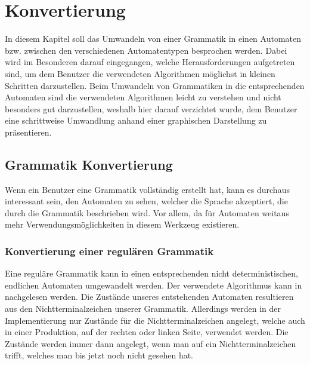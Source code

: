 



\chapter{Konvertierung}\label{ConverTo}

In diesem Kapitel soll das Umwandeln von einer Grammatik in einen Automaten bzw.
zwischen den verschiedenen Automatentypen besprochen werden. Dabei wird im
Besonderen darauf eingegangen, welche Herausforderungen aufgetreten sind, um dem
Benutzer die verwendeten Algorithmen möglichst in kleinen Schritten darzustellen.
Beim Umwandeln von Grammatiken in die entsprechenden Automaten sind die
verwendeten Algorithmen leicht zu verstehen und nicht besonders gut darzustellen,
weshalb hier darauf verzichtet wurde, dem Benutzer eine schrittweise Umwandlung
anhand einer graphischen Darstellung zu präsentieren.\vspace{10pt}


\section{Grammatik Konvertierung}\label{ConverToGrammar}

Wenn ein Benutzer eine Grammatik vollständig erstellt hat, kann es durchaus
interessant sein, den Automaten zu sehen, welcher die Sprache akzeptiert, die
durch die Grammatik beschrieben wird. Vor allem, da für Automaten weitaus mehr
Verwendungsmöglichkeiten in diesem Werkzeug existieren.\vspace{10pt}

\subsection{Konvertierung einer regulären Grammatik}\label{ConverToGrammarRegular}

Eine reguläre Grammatik kann in einen entsprechenden nicht deterministischen,
endlichen Automaten umgewandelt werden. Der verwendete Algorithmus kann in
\cite{Compilers} nachgelesen werden. Die Zustände unseres entstehenden Automaten
resultieren aus den Nichtterminalzeichen unserer Grammatik. Allerdings werden in
der Implementierung nur Zustände für die Nichtterminalzeichen angelegt, welche
auch in einer Produktion, auf der rechten oder linken Seite, verwendet werden.
Die Zustände werden immer dann angelegt, wenn man auf ein Nichtterminalzeichen
trifft, welches man bis jetzt noch nicht gesehen hat.\vspace{10pt}


